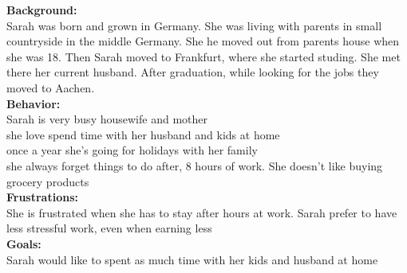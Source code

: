\documentclass[a4paper,10pt,oneside]{scrreprt}
\begin{document}
		\textbf{Background:}\\
				Sarah was born and grown in Germany. She was living with parents in small countryside in the middle Germany. She he moved out from parents house when she was 18. Then Sarah moved to Frankfurt, where she started studing. She met there her current husband. After graduation, while looking for the jobs they moved to Aachen.\\

		\textbf{Behavior:}\\
				Sarah is very busy housewife and mother\\
				she love spend time with her husband and kids at home\\
				once a year she's going for holidays with her family\\
				she always forget things to do after, 8 hours of work. She doesn't like buying grocery products\\

		\textbf{Frustrations:}\\
				She is frustrated when she has to stay after hours at work. Sarah prefer to have less stressful work, even when earning less\\

		\textbf{Goals:}\\
				Sarah would like to spent as much time with her kids and husband at home\\
\end{document}
